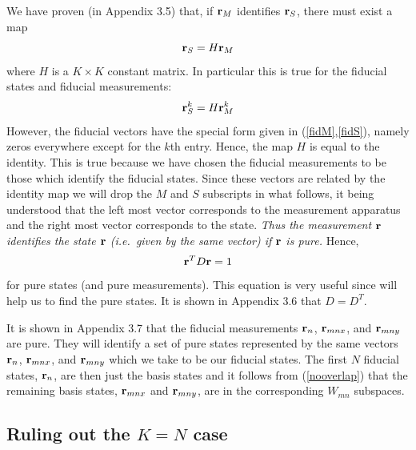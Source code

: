 \documentclass[12pt]{article}
\begin{document}
We have proven (in Appendix 3.5)
that, if ${\bf r}_M$ identifies ${\bf r}_S$, there must exist a map
\begin{equation}
{\bf r}_S = H {\bf r}_M
\end{equation}
where $H$ is a $K\times K$ constant matrix.  In particular this is true for
the fiducial states and fiducial measurements:
\begin{equation}
{\bf r}^k_S = H {\bf r}^k_M
\end{equation}
However, the fiducial vectors have the special form given in
(\ref{fidM},\ref{fidS}), namely zeros everywhere except for the $k$th
entry.  Hence, the map $H$ is equal to the identity.
This is true because we have chosen the fiducial measurements to be
those which identify the fiducial states. Since these vectors are
related by the identity map we will drop the $M$ and $S$
subscripts in what follows, it being understood that the left most
vector corresponds to the measurement apparatus and the right most vector
corresponds to the state.  {\it Thus the measurement ${\bf r}$ identifies the
state ${\bf r}$ (i.e.\ given by the same vector) if ${\bf r}$ is pure.}  Hence,
\begin{equation}
{\bf r}^T D {\bf r}=1
\end{equation}
for pure states (and pure measurements).
This equation is very useful since will help us to find the pure states.
It is shown in Appendix 3.6 that $D=D^T$.

It is shown in Appendix 3.7 that the fiducial measurements ${\bf r}_n$,
${\bf r}_{mnx}$, and ${\bf r}_{mny}$ are pure.  They will identify a set
of pure states represented by the same vectors ${\bf r}_n$,
${\bf r}_{mnx}$, and ${\bf r}_{mny}$ which we take to be our fiducial
states.  The first $N$ fiducial states, ${\bf r}_n$, are then just the
basis states and it follows from (\ref{nooverlap}) that the remaining
basis states, ${\bf r}_{mnx}$ and ${\bf r}_{mny}$, are in the
corresponding $W_{mn}$ subspaces.


\subsection{Ruling out the $K=N$ case}\label{notclassical}
\end{document}
